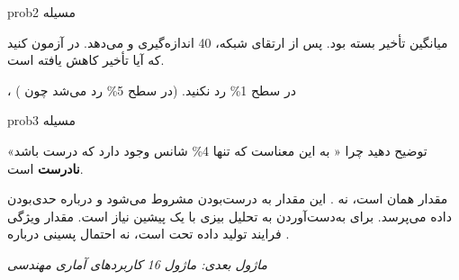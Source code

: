 \begin{PSbox}[unbreakable]{prob}{مسیله 2}

میانگین تأخیر بسته  بود. پس از ارتقای شبکه، 40 اندازه‌گیری  و  می‌دهد. در  آزمون کنید که آیا تأخیر کاهش یافته است.

\PSsolution{} ،  در سطح 1\% رد نکنید. (در سطح 5\% رد می‌شد چون )

\end{PSbox}

\begin{PSbox}[unbreakable]{prob}{مسیله 3}

توضیح دهید چرا « به این معناست که تنها 4\% شانس وجود دارد که  درست باشد» \textbf{نادرست} است.

\PSsolution{} مقدار  همان  است، نه . این مقدار به  درست‌بودن مشروط می‌شود و درباره حدی‌بودن داده می‌پرسد. برای به‌دست‌آوردن  به تحلیل بیزی با یک پیشین نیاز است. مقدار  ویژگی فرایند تولید داده تحت  است، نه احتمال پسینی درباره .

\emph{ماژول بعدی: {ماژول 16  کاربردهای آماری مهندسی}}

\end{PSbox}
